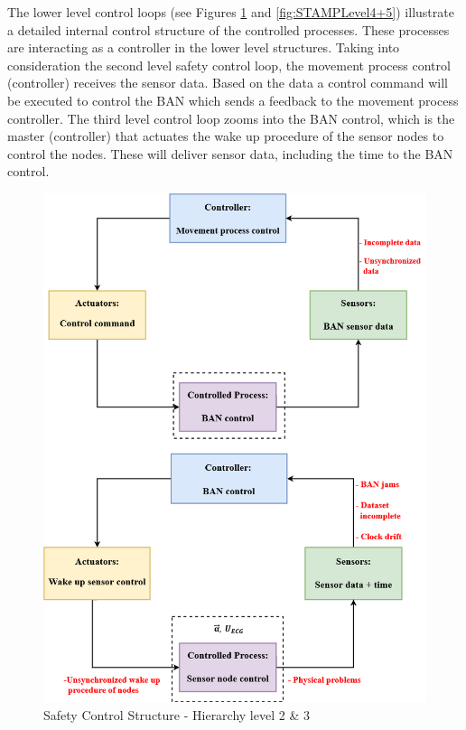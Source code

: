 \documentclass[review]{elsarticle}
\begin{document}
\begin{itemize}
	The lower level control loops (see Figures \ref{fig:STAMPLevel2+3} and \ref{fig:STAMPLevel4+5}) illustrate a detailed internal control structure of the controlled processes. These processes are interacting as a controller in the lower level structures. Taking into consideration the second level safety control loop, the movement process control (controller) receives the sensor data. Based on the data a control command will be executed to control the BAN which sends a feedback to the movement process controller. The third level control loop zooms into the BAN control, which is the master (controller) that actuates the wake up procedure of the sensor nodes to control the nodes. These will deliver sensor data, including the time to the BAN control.
	\begin{figure}[!ht]
		\centering
		\includegraphics[scale=0.56]{Images/STAMP2+3level(3)}
		\caption[Safety Control Structure - Hierarchy level 2 \& 3]{Safety Control Structure - Hierarchy level 2 \& 3}
		\label{fig:STAMPLevel2+3}
	\end{figure} 


\end{itemize}
\end{document}
